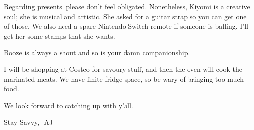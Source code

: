 \documentclass[dvipsnames]{article}
\begin{document}
Regarding presents, please don't feel obligated. Nonetheless, Kiyomi is a creative soul; she is musical and artistic. She asked for a guitar strap so you can get one of those. We also need a spare Nintendo Switch remote if someone is balling. I'll get her some stamps that she wants.

Booze is always a shout and so is your damn companionship.

I will be shopping at Costco for savoury stuff, and then the oven will cook the marinated meats. We have finite fridge space, so be wary of bringing too much food.

We look forward to catching up with y'all. 

Stay Savvy,
-AJ
\end{document}
